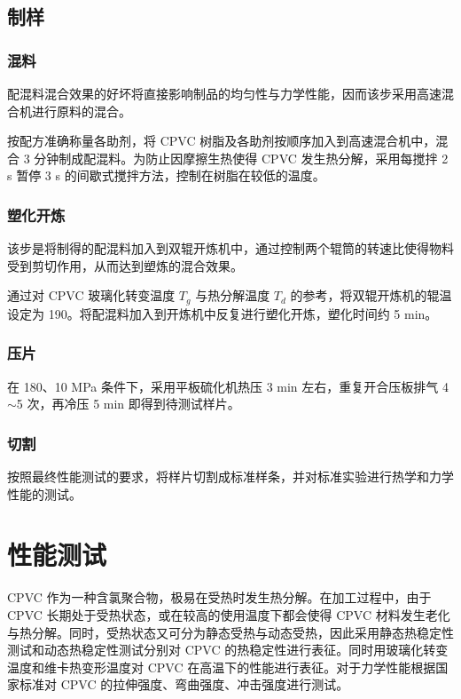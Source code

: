 \subsection{制样}

\subsubsection{混料}
配混料混合效果的好坏将直接影响制品的均匀性与力学性能，因而该步采用高速混合机进行原料的混合。\par
按配方准确称量各助剂，将 CPVC 树脂及各助剂按顺序加入到高速混合机中，混合 3 分钟制成配混料。为防止因摩擦生热使得 CPVC 发生热分解，采用每搅拌 2 s 暂停 3 s 的间歇式搅拌方法，控制在树脂在较低的温度。

\subsubsection{塑化开炼}
该步是将制得的配混料加入到双辊开炼机中，通过控制两个辊筒的转速比使得物料受到剪切作用，从而达到塑炼的混合效果。\par
通过对 CPVC 玻璃化转变温度 $T_g$ 与热分解温度 $T_d$ 的参考，将双辊开炼机的辊温设定为 190\cd。将配混料加入到开炼机中反复进行塑化开炼，塑化时间约 5 min。

\subsubsection{压片}
在 180\cd、10 MPa 条件下，采用平板硫化机热压 3 min 左右，重复开合压板排气 4$\sim$5 次，再冷压 5 min 即得到待测试样片。

\subsubsection{切割}
按照最终性能测试的要求，将样片切割成标准样条，并对标准实验进行热学和力学性能的测试。


\section{性能测试}
CPVC 作为一种含氯聚合物，极易在受热时发生热分解。在加工过程中，由于 CPVC 长期处于受热状态，或在较高的使用温度下都会使得 CPVC 材料发生老化与热分解。同时，受热状态又可分为静态受热与动态受热，因此采用静态热稳定性测试和动态热稳定性测试分别对 CPVC 的热稳定性进行表征。同时用玻璃化转变温度和维卡热变形温度对 CPVC 在高温下的性能进行表征。对于力学性能根据国家标准对 CPVC 的拉伸强度、弯曲强度、冲击强度进行测试。

